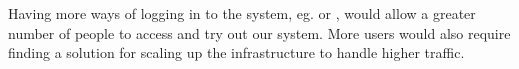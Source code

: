 Having more ways of logging in to the system, eg. \github{} or \facebook{}, would allow a greater number of people to access and try out our system. More users would also require finding a solution for scaling up the infrastructure to handle higher traffic.
